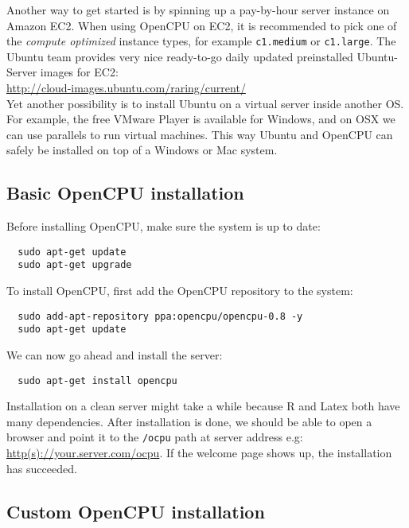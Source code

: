 \documentclass{scrartcl}\usepackage[]{graphicx}\usepackage[]{color}
\begin{document}
\noindent Another way to get started is by spinning up a pay-by-hour server instance on Amazon EC2. When using OpenCPU on EC2, it is recommended to pick one of the \emph{compute optimized} instance types, for example \texttt{c1.medium} or \texttt{c1.large}. The Ubuntu team provides very nice ready-to-go daily updated preinstalled Ubuntu-Server images for EC2:\\

\url{http://cloud-images.ubuntu.com/raring/current/} \\

\noindent Yet another possibility is to install Ubuntu on a virtual server inside another OS. For example, the free VMware Player is available for Windows, and on OSX we can use parallels to run virtual machines. This way Ubuntu and OpenCPU can safely be installed on top of a Windows or Mac system. \\

\subsection{Basic OpenCPU installation}

Before installing OpenCPU, make sure the system is up to date:

\begin{verbatim}
  sudo apt-get update
  sudo apt-get upgrade
\end{verbatim}
To install OpenCPU, first add the OpenCPU repository to the system:

\begin{verbatim}
  sudo add-apt-repository ppa:opencpu/opencpu-0.8 -y
  sudo apt-get update
\end{verbatim}
We can now go ahead and install the server:

\begin{verbatim}
  sudo apt-get install opencpu
\end{verbatim}
Installation on a clean server might take a while because R and Latex both have many dependencies. After installation is done, we should be able to open a browser and point it to the \texttt{/ocpu} path at server address e.g: \href{http://your.server.com/ocpu}{http(s)://your.server.com/ocpu}. If the welcome page shows up, the installation has succeeded. 

\subsection{Custom OpenCPU installation}
\end{document}

